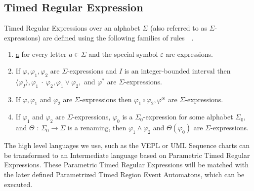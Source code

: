 		\subsection{Timed Regular Expression}
			\begin{dfn}
				Timed Regular Expressions over an alphabet $\Sigma$ (also referred to as $\Sigma$-expressions)
				are defined using the following families of rules~\citep{tre}~.
				\begin{enumerate}
					\item \underline{a} for every letter $a \in \Sigma$ and the special symbol $\varepsilon$ are expressions.
					\item If $\varphi, \varphi_1, \varphi_2$ are $\Sigma$-expressions and $I$ is an integer-bounded interval then
						$\langle\varphi_I\rangle, \varphi_1~\cdot~\varphi_2, \varphi_1 \vee \varphi_2,$ and $\varphi^\ast$ are $\Sigma$-expressions.
					\item If $\varphi, \varphi_1$ and $\varphi_2$ are $\Sigma$-expressions then $\varphi_1 \circ \varphi_2, \varphi^\circledast$ are
						$\Sigma$-expressions.
					\item If $\varphi_1$ and $\varphi_2$ are $\Sigma$-expressions, $\varphi_0$ is a $\Sigma_0$-expression
						for some alphabet $\Sigma_0$, and $\Theta$ : $\Sigma_0 \rightarrow \Sigma$ is
						a renaming, then $\varphi_1 \wedge \varphi_2$ and $\Theta(\varphi_0)$ are $\Sigma$-expressions.
				\end{enumerate}
			\end{dfn}
			
		The high level languages we use, such as the VEPL or UML Sequence charts can be transformed to an Intermediate language based on Parametric Timed Regular Expressions.
		These Parametric Timed Regular Expressions will be matched with the later defined Parametrized Timed Region Event Automatons, which can be executed.
		
